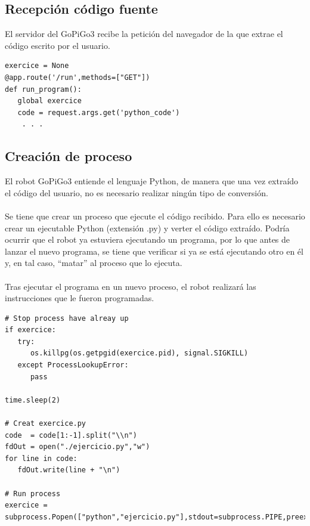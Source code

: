 \documentclass{report}
\begin{document}
\subsection{Recepción código fuente}

El servidor del GoPiGo3 recibe la petición del navegador de la que extrae el código escrito por el usuario.
\\
\begin{lstlisting}[frame=single,breaklines=true, label=Extracción del código en el servidor del GoPiGo3, caption=Extracción del código en el servidor del GoPiGo3,  captionpos=b]
exercice = None
@app.route('/run',methods=["GET"])
def run_program():
   global exercice
   code = request.args.get('python_code')
    . . .
\end{lstlisting}

\subsection{Creación de proceso}

El robot GoPiGo3 entiende el lenguaje Python, de manera que una vez extraído el código del usuario, no es necesario realizar ningún tipo de conversión.
\\
\\
Se tiene que crear un proceso que ejecute el código recibido. Para ello es necesario crear un ejecutable Python (extensión .py) y verter el código extraído. Podría ocurrir que el robot ya estuviera ejecutando un programa, por lo que antes de lanzar el nuevo programa, se tiene que verificar si ya se está ejecutando otro en él y, en tal caso, “matar” al proceso que lo ejecuta.
\\
\\
Tras ejecutar el programa en un nuevo proceso, el robot realizará las instrucciones que le fueron programadas.
\\
\begin{lstlisting}[frame=single,breaklines=true, label=Creación del proceso con el programa para el Robot, caption=Creación del proceso con el programa para el Robot,  captionpos=b]
# Stop process have alreay up
if exercice:
   try:
      os.killpg(os.getpgid(exercice.pid), signal.SIGKILL)
   except ProcessLookupError:
      pass

time.sleep(2)
    
# Creat exercice.py
code  = code[1:-1].split("\\n")
fdOut = open("./ejercicio.py","w")
for line in code:
   fdOut.write(line + "\n")
    
# Run process
exercice = subprocess.Popen(["python","ejercicio.py"],stdout=subprocess.PIPE,preexec_fn=os.setsid)
\end{lstlisting}
\end{document}
